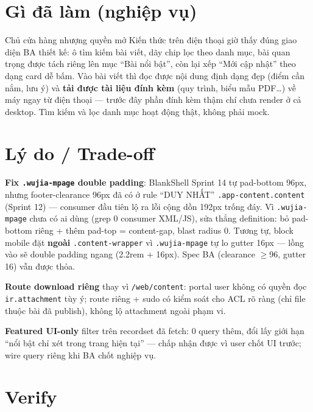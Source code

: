 \section{Gì đã làm (nghiệp vụ)}

Chủ cửa hàng nhượng quyền mở Kiến thức trên điện thoại giờ thấy đúng giao diện BA
thiết kế: ô tìm kiếm bài viết, dãy chip lọc theo danh mục, bài quan trọng được tách
riêng lên mục ``Bài nổi bật'', còn lại xếp ``Mới cập nhật'' theo dạng card dễ bấm.
Vào bài viết thì đọc được nội dung định dạng đẹp (điểm cần nắm, lưu ý) và \textbf{tải
được tài liệu đính kèm} (quy trình, biểu mẫu PDF\ldots) về máy ngay từ điện thoại ---
trước đây phần đính kèm thậm chí chưa render ở cả desktop. Tìm kiếm và lọc danh mục
hoạt động thật, không phải mock.

\section{Lý do / Trade-off}

\textbf{Fix \texttt{.wujia-mpage} double padding}: BlankShell Sprint 14 tự pad-bottom
96px, nhưng footer-clearance 96px đã có ở rule ``DUY NHẤT''
\texttt{.app-content.content} (Sprint 12) --- consumer đầu tiên lộ ra lỗi cộng dồn
192px trống đáy. Vì \texttt{.wujia-mpage} chưa có ai dùng (grep 0 consumer XML/JS),
sửa thẳng definition: bỏ pad-bottom riêng + thêm pad-top = content-gap, blast radius
0. Tương tự, block mobile đặt \textbf{ngoài} \texttt{.content-wrapper} vì
\texttt{.wujia-mpage} tự lo gutter 16px --- lồng vào sẽ double padding ngang
(2.2rem + 16px). Spec BA (clearance \(\geq\)96, gutter 16) vẫn được thỏa.

\textbf{Route download riêng} thay vì \texttt{/web/content}: portal user không có
quyền đọc \texttt{ir.attachment} tùy ý; route riêng + sudo có kiểm soát cho ACL rõ
ràng (chỉ file thuộc bài đã publish), không lộ attachment ngoài phạm vi.

\textbf{Featured UI-only} filter trên recordset đã fetch: 0 query thêm, đổi lấy
giới hạn ``nổi bật chỉ xét trong trang hiện tại'' --- chấp nhận được vì user chốt
UI trước; wire query riêng khi BA chốt nghiệp vụ.

\section{Verify}

